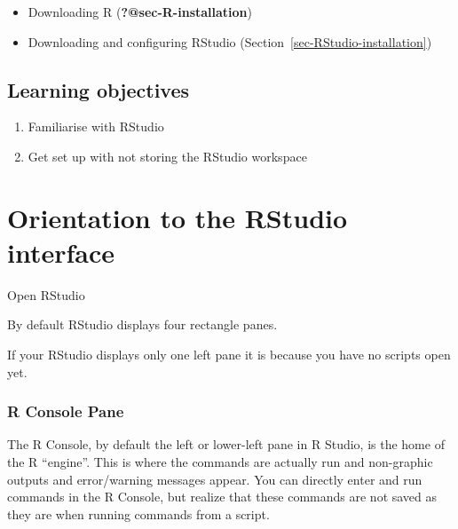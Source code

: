 \documentclass[
  letterpaper,
  DIV=11,
  numbers=noendperiod]{scrreprt}
\providecommand{\tightlist}{%
  \setlength{\itemsep}{0pt}\setlength{\parskip}{0pt}}\usepackage{longtable,booktabs,array}
\begin{document}
\begin{itemize}
\tightlist
\item
  Downloading R (\textbf{?@sec-R-installation})
\item
  Downloading and configuring RStudio
  (Section~\ref{sec-RStudio-installation})
\end{itemize}

\hypertarget{learning-objectives-3}{%
\subsection{Learning objectives}\label{learning-objectives-3}}

\begin{enumerate}
\def\labelenumi{\arabic{enumi}.}
\tightlist
\item
  Familiarise with RStudio
\item
  Get set up with not storing the RStudio workspace
\end{enumerate}

\hypertarget{orientation-to-the-rstudio-interface}{%
\section{Orientation to the RStudio
interface}\label{orientation-to-the-rstudio-interface}}

Open RStudio

By default RStudio displays four rectangle panes.

\begin{tcolorbox}[enhanced jigsaw, colframe=quarto-callout-tip-color-frame, colback=white, rightrule=.15mm, bottomrule=.15mm, left=2mm, arc=.35mm, coltitle=black, title=\textcolor{quarto-callout-tip-color}{\faLightbulb}\hspace{0.5em}{Tip}, opacitybacktitle=0.6, bottomtitle=1mm, opacityback=0, toptitle=1mm, toprule=.15mm, colbacktitle=quarto-callout-tip-color!10!white, titlerule=0mm, leftrule=.75mm, breakable]
If your RStudio displays only one left pane it is because you have no
scripts open yet.
\end{tcolorbox}

\hypertarget{r-console-pane}{%
\subsubsection{R Console Pane}\label{r-console-pane}}

The R Console, by default the left or lower-left pane in R Studio, is
the home of the R ``engine''. This is where the commands are actually
run and non-graphic outputs and error/warning messages appear. You can
directly enter and run commands in the R Console, but realize that these
commands are not saved as they are when running commands from a script.
\end{document}
